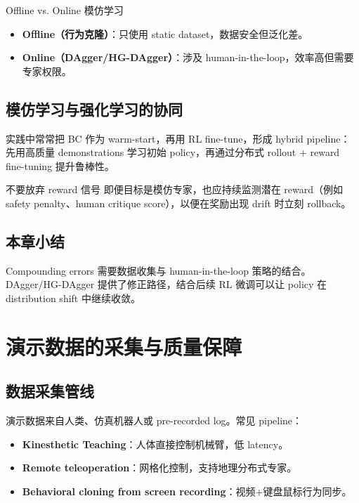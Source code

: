 \documentclass[a4paper]{article}
\begin{document}
\begin{knowledgebox}{Offline vs. Online 模仿学习}
\begin{itemize}
    \item \textbf{Offline（行为克隆）}：只使用 static dataset，数据安全但泛化差。
    \item \textbf{Online（DAgger/HG-DAgger）}：涉及 human-in-the-loop，效率高但需要专家权限。
\end{itemize}
\end{knowledgebox}

\subsection{模仿学习与强化学习的协同}

实践中常常把 BC 作为 warm-start，再用 RL fine-tune，形成 hybrid pipeline：先用高质量 demonstrations 学习初始 policy，再通过分布式 rollout + reward fine-tuning 提升鲁棒性。

\begin{warningbox}{不要放弃 reward 信号}
即便目标是模仿专家，也应持续监测潜在 reward（例如 safety penalty、human critique score），以便在奖励出现 drift 时立刻 rollback。
\end{warningbox}

\subsection{本章小结}

Compounding errors 需要数据收集与 human-in-the-loop 策略的结合。DAgger/HG-DAgger 提供了修正路径，结合后续 RL 微调可以让 policy 在 distribution shift 中继续收敛。

\section{演示数据的采集与质量保障}

\subsection{数据采集管线}

演示数据来自人类、仿真机器人或 pre-recorded log。常见 pipeline：
\begin{itemize}
    \item \textbf{Kinesthetic Teaching}：人体直接控制机械臂，低 latency。
    \item \textbf{Remote teleoperation}：网格化控制，支持地理分布式专家。
    \item \textbf{Behavioral cloning from screen recording}：视频+键盘鼠标行为同步。
\end{itemize}
\end{document}
